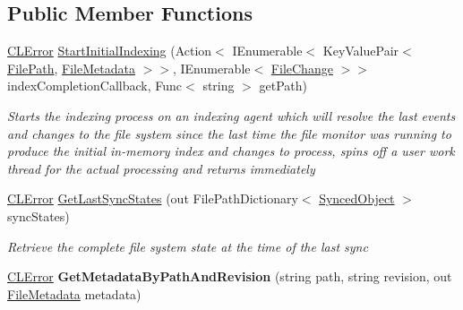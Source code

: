 \subsection*{Public Member Functions}
\begin{DoxyCompactItemize}
\item 
\hyperlink{class_cloud_api_public_1_1_model_1_1_c_l_error}{C\-L\-Error} \hyperlink{class_cloud_api_public_1_1_s_q_l_indexer_1_1_indexing_agent_a9eee0160dda925db6c1c7990d36dff54}{Start\-Initial\-Indexing} (Action$<$ I\-Enumerable$<$ Key\-Value\-Pair$<$ \hyperlink{class_cloud_api_public_1_1_model_1_1_file_path}{File\-Path}, \hyperlink{class_cloud_api_public_1_1_model_1_1_file_metadata}{File\-Metadata} $>$$>$, I\-Enumerable$<$ \hyperlink{class_cloud_api_public_1_1_model_1_1_file_change}{File\-Change} $>$$>$ index\-Completion\-Callback, Func$<$ string $>$ get\-Path)
\begin{DoxyCompactList}\small\item\em Starts the indexing process on an indexing agent which will resolve the last events and changes to the file system since the last time the file monitor was running to produce the initial in-\/memory index and changes to process, spins off a user work thread for the actual processing and returns immediately \end{DoxyCompactList}\item 
\hyperlink{class_cloud_api_public_1_1_model_1_1_c_l_error}{C\-L\-Error} \hyperlink{class_cloud_api_public_1_1_s_q_l_indexer_1_1_indexing_agent_a7e399ddd4f016dd2484a028f2439ce20}{Get\-Last\-Sync\-States} (out File\-Path\-Dictionary$<$ \hyperlink{class_cloud_api_public_1_1_s_q_l_indexer_1_1_synced_object}{Synced\-Object} $>$ sync\-States)
\begin{DoxyCompactList}\small\item\em Retrieve the complete file system state at the time of the last sync \end{DoxyCompactList}\item 
\hypertarget{class_cloud_api_public_1_1_s_q_l_indexer_1_1_indexing_agent_abbc921fa18a1a75f0912c62ddfc16779}{\hyperlink{class_cloud_api_public_1_1_model_1_1_c_l_error}{C\-L\-Error} {\bfseries Get\-Metadata\-By\-Path\-And\-Revision} (string path, string revision, out \hyperlink{class_cloud_api_public_1_1_model_1_1_file_metadata}{File\-Metadata} metadata)}\label{class_cloud_api_public_1_1_s_q_l_indexer_1_1_indexing_agent_abbc921fa18a1a75f0912c62ddfc16779}


\end{DoxyCompactItemize}
